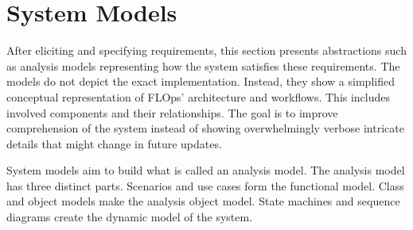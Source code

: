 \section{System Models}

After eliciting and specifying requirements, this section presents abstractions such as analysis models representing how the system satisfies these requirements.
The models do not depict the exact implementation.
Instead, they show a simplified conceptual representation of FLOps' architecture and workflows.
This includes involved components and their relationships.
The goal is to improve comprehension of the system instead of showing overwhelmingly verbose intricate details that might change in future updates.

System models aim to build what is called an analysis model.
The analysis model has three distinct parts.
Scenarios and use cases form the functional model.
Class and object models make the analysis object model.
State machines and sequence diagrams create the dynamic model of the system. \cite{book:bruegge}

% 










